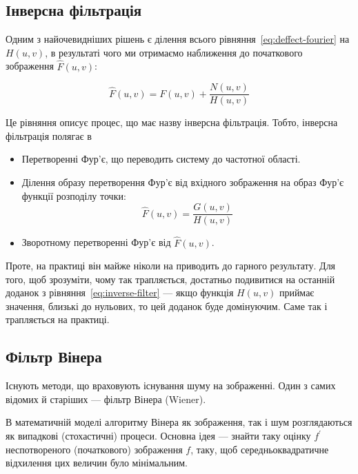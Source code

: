 \documentclass{diploma}
\begin{document}
    \subsection{Інверсна фільтрація}
      Одним з найочевидніших рішень є ділення всього
      рівняння~\eqref{eq:deffect-fourier} на $H\left( u, v \right)$, в
      результаті чого ми отримаємо наближення до початкового зображення
      $\hat{F}\left( u, v \right)$:

      \begin{equation}
        \hat{F}\left( u, v \right) = F\left( u, v \right) + \frac{N\left( u, v
        \right)}{H\left( u, v \right)}
        \label{eq:inverse-filter:idea}
      \end{equation}

      Це рівняння описує процес, що має назву інверсна фільтрація.
      Тобто, інверсна фільтрація полягає в
      \begin{itemize}
        \item Перетворенні Фур’є, що переводить систему до частотної області.
        \item Ділення образу перетворення Фур’є від вхідного зображення на
          образ Фур’є функції розподілу точки:
          \begin{equation}
            \hat{F}\left( u, v \right) = \frac{G\left( u, v \right)}{H\left(
            u, v \right)}
            \label{eq:inverse-filter}
          \end{equation}
        \item Зворотному перетворенні Фур’є від $\hat{F}\left( u, v \right)$.
      \end{itemize}
      Проте, на практиці він майже ніколи на приводить до гарного результату.
      Для того, щоб зрозуміти, чому так трапляється, достатньо подивитися на
      останній доданок з рівняння~\eqref{eq:inverse-filter} --- якщо функція $H\left(
      u, v \right)$ приймає значення, близькі до нульових, то цей доданок буде
      домінуючим.
      Саме так і трапляється на практиці.\cite{honsales-woods-eddins}
      \clearpage
    \subsection{Фільтр Вінера}
      Існують методи, що враховують існування шуму на зображенні.
      Один з самих відомих й старіших --- фільтр Вінера (Wiener).

      В математичній моделі алгоритму Вінера як зображення, так і шум
      розглядаються як випадкові (стохастичні) процеси.
      Основна ідея --- знайти таку оцінку $f^\prime$ неспотвореного
      (початкового) зображення $f$, таку, щоб середньоквадратичне відхилення
      цих величин було мінімальним.
\end{document}
